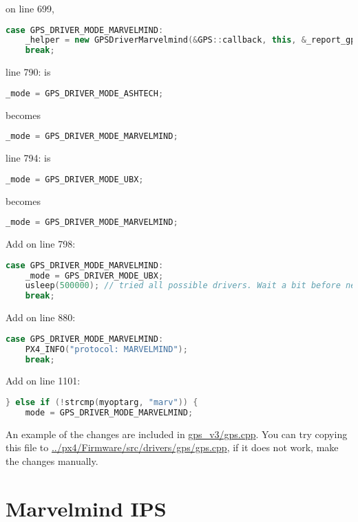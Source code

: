 on line 699, 
\begin{lstlisting}[language=c++]
	case GPS_DRIVER_MODE_MARVELMIND:
	_helper = new GPSDriverMarvelmind(&GPS::callback, this, &_report_gps_pos, _p_report_sat_info);
	break;
\end{lstlisting}


line 790:
is	
\begin{lstlisting}[language=c++]
	_mode = GPS_DRIVER_MODE_ASHTECH;
\end{lstlisting}
becomes	
\begin{lstlisting}[language=c++]
	_mode = GPS_DRIVER_MODE_MARVELMIND;
\end{lstlisting}

line 794:
is 	
\begin{lstlisting}[language=c++]
	_mode = GPS_DRIVER_MODE_UBX;
\end{lstlisting}
becomes 
\begin{lstlisting}[language=c++]
	_mode = GPS_DRIVER_MODE_MARVELMIND;
\end{lstlisting}

Add on line 798:
\begin{lstlisting}[language=c++]
	case GPS_DRIVER_MODE_MARVELMIND:
	_mode = GPS_DRIVER_MODE_UBX;
	usleep(500000); // tried all possible drivers. Wait a bit before next round
	break;
\end{lstlisting}


Add on line 880:
\begin{lstlisting}[language=c++]
	case GPS_DRIVER_MODE_MARVELMIND:
	PX4_INFO("protocol: MARVELMIND");
	break;
\end{lstlisting}


Add on line 1101:
\begin{lstlisting}[language=c++]
	} else if (!strcmp(myoptarg, "marv")) {
	mode = GPS_DRIVER_MODE_MARVELMIND;
\end{lstlisting}


An example of the changes are included in \url{gps_v3/gps.cpp}. You can try copying this file to \url{../px4/Firmware/src/drivers/gps/gps.cpp}, if it does not work, make the changes manually.
\section{Marvelmind IPS}